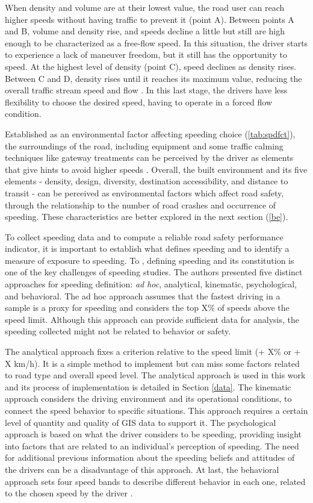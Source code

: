 When density and volume are at their lowest value, the road user can reach higher speeds without having traffic to prevent it (point A). Between points A and B, volume and density rise, and speeds decline a little but still are high enough to be characterized as a free-flow speed. In this situation, the driver starts to experience a lack of maneuver freedom, but it still has the opportunity to speed. At the highest level of density (point C), speed declines as density rises. Between C and D, density rises until it reaches its maximum value, reducing the overall traffic stream speed and flow \cite{Green2020}. In this last stage, the drivers have less flexibility to choose the desired speed, having to operate in a forced flow condition. 

Established as an environmental factor affecting speeding choice (\autoref{tab:spdfct}), the surroundings of the road, including equipment and some traffic calming techniques like gateway treatments can be perceived by the driver as elements that give hints to avoid higher speeds \cite{WHO2008}. Overall, the built environment and its five elements - density, design, diversity, destination accessibility, and distance to transit - can be perceived as environmental factors which affect road safety, through the relationship to the number of road crashes and occurrence of speeding. These characteristics are better explored in the next section (\ref{be}). 

To collect speeding data and to compute a reliable road safety performance indicator, it is important to establish what defines speeding and to identify a measure of exposure to speeding. To \textcite{Richard2013}, defining speeding and its constitution is one of the key challenges of speeding studies. The authors presented five distinct approaches for speeding definition: \textit{ad hoc}, analytical, kinematic, psychological, and behavioral. The ad hoc approach assumes that the fastest driving in a sample is a proxy for speeding and considers the top X\% of speeds above the speed limit. Although this approach can provide sufficient data for analysis, the speeding collected might not be related to behavior or safety. 

The analytical approach fixes a criterion relative to the speed limit (+ X\% or + X km/h). It is a simple method to implement but can miss some factors related to road type and overall speed level. The analytical approach is used in this work and its process of implementation is detailed in Section \ref{data}. The kinematic approach considers the driving environment and its operational conditions, to connect the speed behavior to specific situations. This approach requires a certain level of quantity and quality of GIS data to support it. The psychological approach is based on what the driver considers to be speeding, providing insight into factors that are related to an individual's perception of speeding. The need for additional previous information about the speeding beliefs and attitudes of the drivers can be a disadvantage of this approach. At last, the behavioral approach sets four speed bands to describe different behavior in each one, related to the chosen speed by the driver \cite{Richard2013}.

